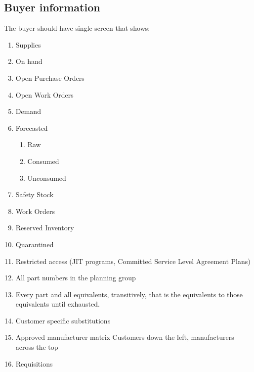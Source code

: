 \documentclass[letterpaper,10pt,english]{sphinxmanual}
\begin{document}
\subsection{Buyer information}
\label{BusinessProcessReengineering:id10}
The buyer should have single screen that shows:
\begin{enumerate}
\item {} 
Supplies

\item {} 
On hand

\item {} 
Open Purchase Orders

\item {} 
Open Work Orders

\item {} 
Demand

\item {} 
Forecasted
\begin{enumerate}
\item {} 
Raw

\item {} 
Consumed

\item {} 
Unconsumed

\end{enumerate}

\item {} 
Safety Stock

\item {} 
Work Orders

\item {} 
Reserved Inventory

\item {} 
Quarantined

\item {} 
Restricted access (JIT programs, Committed Service Level Agreement
Plans)

\item {} 
All part numbers in the planning group

\item {} 
Every part and all equivalents, transitively, that is the equivalents
to those equivalents until exhausted.

\item {} 
Customer specific substitutions

\item {} 
Approved manufacturer matrix Customers down the left, manufacturers
across the top

\item {} 
Requisitions


\end{enumerate}
\end{document}
